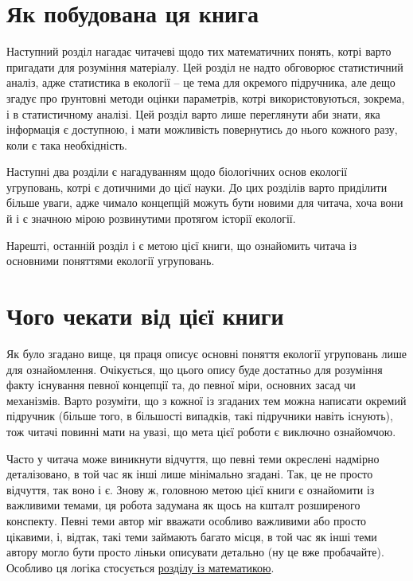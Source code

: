 \documentclass[
  11pt,
]{book}
\begin{document}
\section{Як побудована ця книга}\label{how-built}

Наступний розділ нагадає читачеві щодо тих математичних понять, котрі варто пригадати для розуміння матеріалу. Цей розділ не надто обговорює статистичний аналіз, адже статистика в екології -- це тема для окремого підручника, але дещо згадує про ґрунтовні методи оцінки параметрів, котрі використовуються, зокрема, і в статистичному аналізі. Цей розділ варто лише переглянути аби знати, яка інформація є доступною, і мати можливість повернутись до нього кожного разу, коли є така необхідність.

Наступні два розділи є нагадуванням щодо біологічних основ екології угруповань, котрі є дотичними до цієї науки. До цих розділів варто приділити більше уваги, адже чимало концепцій можуть бути новими для читача, хоча вони й і є значною мірою розвинутими протягом історії екології.

Нарешті, останній розділ і є метою цієї книги, що ознайомить читача із основними поняттями екології угруповань.

\section{Чого чекати від цієї книги}\label{expect}

Як було згадано вище, ця праця описує основні поняття екології угруповань лише для ознайомлення. Очікується, що цього опису буде достатньо для розуміння факту існування певної концепції та, до певної міри, основних засад чи механізмів. Варто розуміти, що з кожної із згаданих тем можна написати окремий підручник (більше того, в більшості випадків, такі підручники навіть існують), тож читачі повинні мати на увазі, що мета цієї роботи є виключно ознайомчою.

Часто у читача може виникнути відчуття, що певні теми окреслені надмірно деталізовано, в той час як інші лише мінімально згадані. Так, це не просто відчуття, так воно і є. Знову ж, головною метою цієї книги є ознайомити із важливими темами, ця робота задумана як щось на кшталт розширеного конспекту. Певні теми автор міг вважати особливо важливими або просто цікавими, і, відтак, такі теми займають багато місця, в той час як інші теми автору могло бути просто ліньки описувати детально (ну це вже пробачайте). Особливо ця логіка стосується \hyperref[numerical-ecology]{розділу із математикою}.
\end{document}
